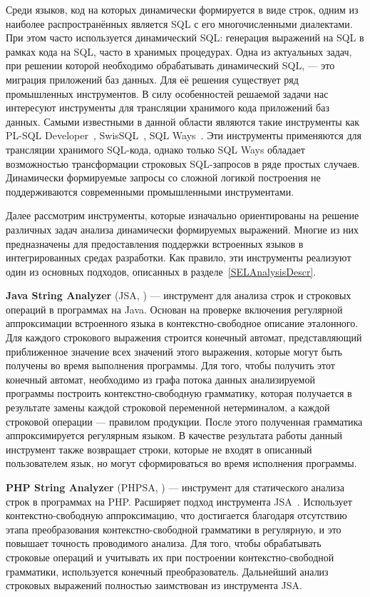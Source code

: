     Среди языков, код на которых динамически формируется в виде строк, одним из наиболее распространённых является SQL с его многочисленными диалектами.  При этом часто используется динамический SQL: генерация выражений на SQL в рамках кода на SQL, часто в хранимых процедурах. Одна из актуальных задач, при решении которой необходимо обрабатывать динамический SQL, --- это миграция приложений баз данных. Для её решения существует ряд промышленных инструментов. В силу особенностей решаемой задачи нас интересуют инструменты для трансляции хранимого кода приложений баз данных. Самыми известными в данной области являются такие инструменты как PL-SQL Developer~\cite{PLSQLDeveloper}, SwisSQL~\cite{SwissSQL}, SQL Ways~\cite{SQLWays}. Эти инструменты применяются для трансляции хранимого SQL-кода, однако только SQL Ways обладает возможностью трансформации строковых SQL-запросов в ряде простых случаев. Динамически формируемые запросы со сложной логикой построения не поддерживаются современными промышленными инструментами.
    
    Далее рассмотрим инструменты, которые изначально ориентированы на решение различных задач анализа динамически формируемых выражений. Многие из них предназначены для предоставления поддержки встроенных языков в интегрированных средах разработки. Как правило, эти инструменты реализуют один из основных подходов, описанных в разделе~\ref{SELAnalysisDescr}.

\textbf{Java String Analyzer} (JSA, \cite{JSA, JSAUrl}) {---}  инструмент для анализа строк и строковых операций в программах на Java. Основан на проверке включения регулярной аппроксимации встроенного языка в контекстно-свободное описание эталонного. Для каждого строкового выражения строится конечный автомат, представляющий приближенное значение всех значений этого выражения, которые могут быть получены во время выполнения программы. Для того, чтобы получить этот конечный автомат, необходимо из графа потока данных анализируемой программы построить контекстно-свободную грамматику, которая получается в результате замены каждой строковой переменной нетерминалом, а каждой строковой операции {---} правилом продукции. После этого полученная грамматика аппроксимируется регулярным языком. В качестве результата работы данный инструмент также возвращает строки, которые не входят в описанный пользователем язык, но могут сформироваться во время исполнения программы. 

\textbf{PHP String Analyzer} (PHPSA, \cite{PHPSA, PHPSAUrl}) {---} инструмент для статического анализа строк в программах на PHP. Расширяет подход инструмента JSA~\cite{JSA}. Использует контекстно-свободную аппроксимацию, что достигается благодаря отсутствию этапа преобразования контекстно-свободной грамматики в регулярную, и это повышает точность проводимого анализа. Для того, чтобы обрабатывать строковые операций и учитывать их при построении контекстно-свободной грамматики, используется конечный преобразователь. Дальнейший анализ строковых выражений полностью заимствован из инструмента JSA.

